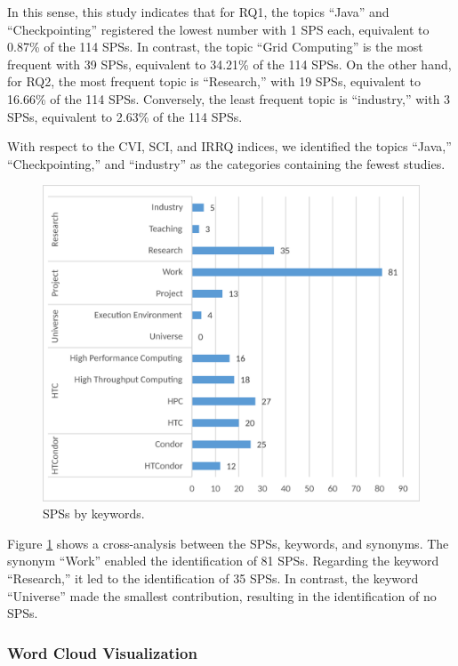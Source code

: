 In this sense, this study indicates that for RQ1, the topics ``Java'' and ``Checkpointing'' registered the lowest number with 1 SPS each, equivalent to 0.87\% of the 114 SPSs. In contrast, the topic ``Grid Computing'' is the most frequent with 39 SPSs, equivalent to 34.21\% of the 114 SPSs. On the other hand, for RQ2, the most frequent topic is ``Research,'' with 19 SPSs, equivalent to 16.66\% of the 114 SPSs. Conversely, the least frequent topic is ``industry,'' with 3 SPSs, equivalent to 2.63\% of the 114 SPSs.

With respect to the CVI, SCI, and IRRQ indices, we identified the topics ``Java,'' ``Checkpointing,'' and ``industry'' as the categories containing the fewest studies.

\begin{figure}[htbp]
	\centering
	\includegraphics[scale=0.3]{resources/figures/Imagen6.eps}
	\caption{SPSs by keywords.}
	\label{fig:SPSsByKeywords}
\end{figure}

Figure \ref{fig:SPSsByKeywords} shows a cross-analysis between the SPSs, keywords, and synonyms. The synonym ``Work'' enabled the identification of 81 SPSs. Regarding the keyword ``Research,'' it led to the identification of 35 SPSs. In contrast, the keyword ``Universe'' made the smallest contribution, resulting in the identification of no SPSs.

\subsubsection{Word Cloud Visualization}

